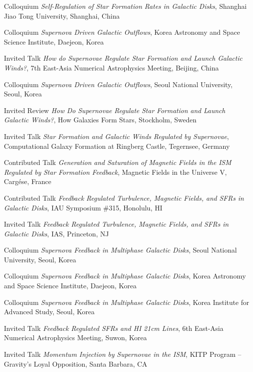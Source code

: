 \documentclass[12pt]{article}
\begin{document}
{Colloquium}
{\emph{Self-Regulation of Star Formation Rates in Galactic Disks},
Shanghai Jiao Tong University,
Shanghai, China}

{Colloquium}
{\emph{Supernova Driven Galactic Outflows},
Korea Astronomy and Space Science Institute,
Daejeon, Korea}

{Invited Talk}
{\emph{How do Supernovae Regulate Star Formation and Launch Galactic Winds?},
7th East-Asia Numerical Astrophysics Meeting,
Beijing, China}

{Colloquium}
{\emph{Supernova Driven Galactic Outflows},
Seoul National University,
Seoul, Korea}

{Invited Review}
{\emph{How Do Supernovae Regulate Star Formation and Launch Galactic Winds?},
How Galaxies Form Stars,
Stockholm, Sweden}

{Invited Talk}
{\emph{Star Formation and Galactic Winds Regulated by Supernovae},
Computational Galaxy Formation at Ringberg Castle,
Tegernsee, Germany}

{Contributed Talk}
{\emph{Generation and Saturation of Magnetic Fields in the ISM Regulated by Star Formation Feedback},
Magnetic Fields in the Universe V,
Carg\'ese, France}

{Contributed Talk}
{\emph{Feedback Regulated Turbulence, Magnetic Fields, and SFRs in Galactic Disks},
IAU Symposium \#315,
Honolulu, HI}

{Invited Talk}
{\emph{Feedback Regulated Turbulence, Magnetic Fields, and SFRs in Galactic Disks},
IAS,
Princeton, NJ}

{Colloquium}
{\emph{Supernova Feedback in Multiphase Galactic Disks},
Seoul National University,
Seoul, Korea}

{Colloquium}
{\emph{Supernova Feedback in Multiphase Galactic Disks},
Korea Astronomy and Space Science Institute,
Daejeon, Korea}

{Colloquium}
{\emph{Supernova Feedback in Multiphase Galactic Disks},
Korea Institute for Advanced Study,
Seoul, Korea}

{Invited Talk}
{\emph{Feedback Regulated SFRs and HI 21cm Lines},
6th East-Asia Numerical Astrophysics Meeting,
Suwon, Korea}

{Invited Talk}
{\emph{Momentum Injection by Supernovae in the ISM},
KITP Program -- Gravity's Loyal Opposition,
Santa Barbara, CA}
\end{document}
